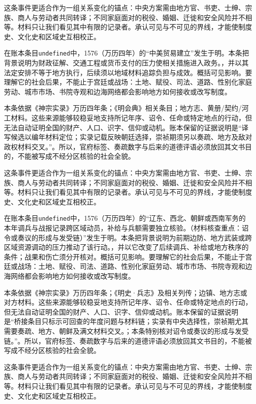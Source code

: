 这条事件更适合作为一组关系变化的锚点：中央方案需由地方官、书吏、士绅、宗族、商人与劳动者共同转译；不同家庭面对的税役、婚姻、迁徙和安全风险并不相等。材料只让我们看见其中有限的记录者。承认可见与不可见的界线，才能使制度史、文化史和区域史互相校正。

在账本条目\texttt{undefined}中，1576（万历四年）的“中美贸易建立”发生于明。本条把背景说明为财政征解、交通工程或货币支付的压力使相关措施进入政务。，并以其法定安排不等于地方执行，后续须以地域材料追踪负担与成效。概括可见影响。要理解它的社会后果，不能止于宫廷或战场：土地、赋役、司法、道路、性别化家庭劳动、城市市场、书院寺观和边海网络都会影响地方如何接收或改写制度。

本条依据《神宗实录》万历四年条；《明会典》相关条目；地方志、黄册/契约/河工材料。这些来源能够较稳妥地支持所记年序、诏令、任命或特定地点的行动，但无法自动证明全国的财产、人口、识字、信仰或动机。账本保留的证据说明是“译写候选以编年材料定位；实录记载反映朝廷选择，崇祯期须另以奏疏、地方及敌对政权材料交叉。”。所以，官府标签、奏疏数字与后来的道德评语必须放回其文书目的，不能被写成不经分区核验的社会全貌。

这条事件更适合作为一组关系变化的锚点：中央方案需由地方官、书吏、士绅、宗族、商人与劳动者共同转译；不同家庭面对的税役、婚姻、迁徙和安全风险并不相等。材料只让我们看见其中有限的记录者。承认可见与不可见的界线，才能使制度史、文化史和区域史互相校正。

在账本条目\texttt{undefined}中，1576（万历四年）的“辽东、西北、朝鲜或西南军务的本年调兵与战报记录跨区域动员，补给与兵额需要独立核验。（材料核查重点：诏令或奏议的形成与发受链）”发生于明。本条把背景说明为前期边防、地方武装或跨区域资源调动的压力推动了该行动。，并以它改变了后续调兵、补给或地方秩序的条件；战果和伤亡须分开核对。概括可见影响。要理解它的社会后果，不能止于宫廷或战场：土地、赋役、司法、道路、性别化家庭劳动、城市市场、书院寺观和边海网络都会影响地方如何接收或改写制度。

本条依据《神宗实录》万历四年条；《明史·兵志》及相关列传；边镇、地方志或对方材料。这些来源能够较稳妥地支持所记年序、诏令、任命或特定地点的行动，但无法自动证明全国的财产、人口、识字、信仰或动机。账本保留的证据说明是“桥接条目只标示可回查的年度问题与材料链；实录有中央选择性，崇祯期尤其需要奏疏、地方、朝鲜及满文材料交叉。；本条特别核对诏令或奏议的形成与发受链。”。所以，官府标签、奏疏数字与后来的道德评语必须放回其文书目的，不能被写成不经分区核验的社会全貌。

这条事件更适合作为一组关系变化的锚点：中央方案需由地方官、书吏、士绅、宗族、商人与劳动者共同转译；不同家庭面对的税役、婚姻、迁徙和安全风险并不相等。材料只让我们看见其中有限的记录者。承认可见与不可见的界线，才能使制度史、文化史和区域史互相校正。

